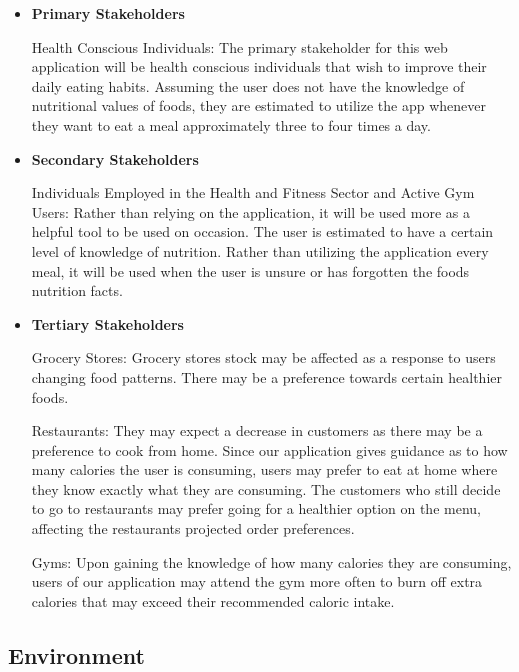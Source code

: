\documentclass{article}
\begin{document}
\begin{itemize}
	\item \textbf{Primary Stakeholders} 

	\subitem Health Conscious Individuals: The primary stakeholder for this web application will be health conscious individuals that wish to improve their daily eating habits. Assuming the user does not have the knowledge of nutritional values of foods, they are estimated to utilize the app whenever they want to eat a meal approximately three to four times a day.\newline

	\item \textbf{Secondary Stakeholders} 

	\subitem Individuals Employed in the Health and Fitness Sector and Active Gym Users: Rather than relying on the application, it will be used more as a helpful tool to be used on occasion. The user is estimated to have a certain level of knowledge of nutrition. Rather than utilizing the application every meal, it will be used when the user is unsure or has forgotten the foods nutrition facts.\newline

	\item \textbf{Tertiary Stakeholders} 

	\subitem Grocery Stores: Grocery stores stock may be affected as a response to users changing food patterns. There may be a preference towards certain healthier foods.

	\subitem Restaurants: They may expect a decrease in customers as there may be a preference to cook from home. Since our application gives guidance as to how many calories the user is consuming, users may prefer to eat at home where they know exactly what they are consuming. The customers who still decide to go to restaurants may prefer going for a healthier option on the menu, affecting the restaurants projected order preferences.

	\subitem Gyms: Upon gaining the knowledge of how many calories they are consuming, users of our application may attend the gym more often to burn off extra calories that may exceed their recommended caloric intake. 

\end{itemize}


\subsection{Environment}
\end{document}
